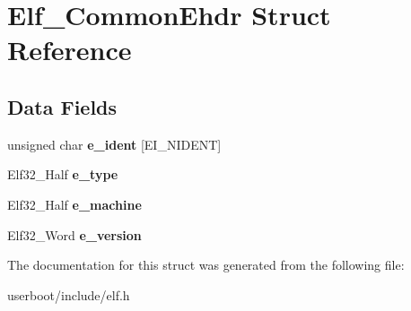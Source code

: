 \hypertarget{structElf__CommonEhdr}{}\section{Elf\+\_\+\+Common\+Ehdr Struct Reference}
\label{structElf__CommonEhdr}
\subsection*{Data Fields}
\begin{DoxyCompactItemize}
\item 
unsigned char {\bfseries e\+\_\+ident} \mbox{[}E\+I\+\_\+\+N\+I\+D\+E\+NT\mbox{]}\hypertarget{structElf__CommonEhdr_a9117940bda66d2663c0934fb2db099d8}{}\label{structElf__CommonEhdr_a9117940bda66d2663c0934fb2db099d8}

\item 
Elf32\+\_\+\+Half {\bfseries e\+\_\+type}\hypertarget{structElf__CommonEhdr_aeb922c9eb63660483852a53248bf7982}{}\label{structElf__CommonEhdr_aeb922c9eb63660483852a53248bf7982}

\item 
Elf32\+\_\+\+Half {\bfseries e\+\_\+machine}\hypertarget{structElf__CommonEhdr_a734b3f77b5a2fe66cd7628957c140aad}{}\label{structElf__CommonEhdr_a734b3f77b5a2fe66cd7628957c140aad}

\item 
Elf32\+\_\+\+Word {\bfseries e\+\_\+version}\hypertarget{structElf__CommonEhdr_ae5bb764997706d521a4f4c42c74ab11c}{}\label{structElf__CommonEhdr_ae5bb764997706d521a4f4c42c74ab11c}

\end{DoxyCompactItemize}


The documentation for this struct was generated from the following file\+:\begin{DoxyCompactItemize}
\item 
userboot/include/elf.\+h\end{DoxyCompactItemize}
